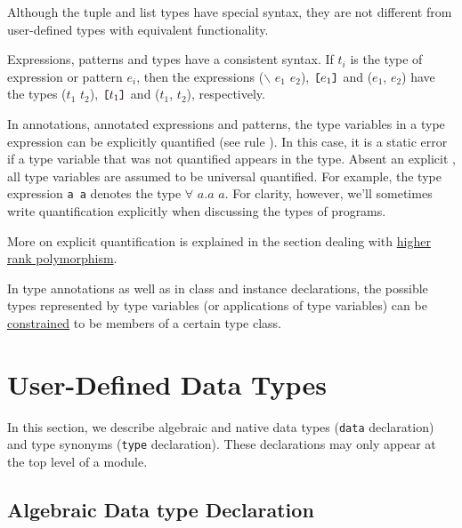 Although the tuple and list types have special syntax, they are not different from user-defined types with equivalent functionality.


Expressions, patterns and types have a consistent syntax. If $t_i$ is the type of expression or pattern $e_i$, then the expressions
($\backslash$ $e_1$ \arrow{} $e_2$),
$\bracka{}e_1\brackz{}$
and ($e_1$, $e_2$) have the types
($t_1$ \arrow{} $t_2$), $\bracka{}t_1\brackz{}$ and ($t_1$, $t_2$),
respectively.

In annotations, annotated expressions and patterns, the type variables in a type expression can be explicitly  quantified (see rule ). In this case, it is a static error if a type variable that was not quantified appears in the type.
Absent an explicit , all type variables are assumed to be universal quantified. For example, the type expression \texttt{a \arrow{} a} denotes the type $\forall$ $a$.$a$ \arrow{} $a$.
For clarity, however, we'll sometimes write quantification explicitly when discussing the types of \frege{} programs.

More on explicit quantification is explained in the section dealing with \hyperref[higher-rank]{higher rank polymorphism}.

In type annotations as well as in class and instance declarations, the possible types represented by type variables (or applications of type variables) can be \hyperref[constraint]{constrained} to be members of a certain type class. 

\section{User-Defined Data Types}   

In this section, we describe algebraic and native data types (\texttt{data} declaration) and type synonyms (\texttt{type} declaration). These declarations may only appear at the top level of a module.

\subsection{Algebraic Data type Declaration}   \label{algdcl}

